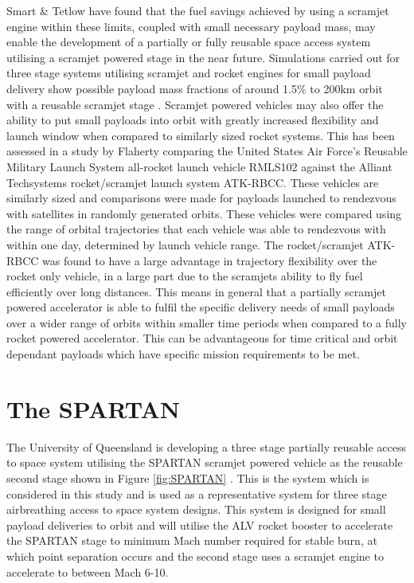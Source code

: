 Smart \& Tetlow \cite{Smart2009} have found that the fuel savings achieved by using a scramjet engine within these limits, coupled with small necessary payload mass, may enable the development of a partially or fully reusable space access system utilising a scramjet powered stage in the near future. Simulations carried out  for three stage systems utilising scramjet and rocket engines for small payload delivery show possible payload mass fractions of around 1.5\% to 200km orbit with a reusable scramjet stage  \cite{Smart2009}. Scramjet powered vehicles may also offer the ability to put small payloads into orbit with greatly increased flexibility and launch window when compared to similarly sized rocket systems. This has been assessed in a study by Flaherty  \cite{Flaherty2010} comparing the United States Air Force's Reusable Military Launch System all-rocket launch vehicle RMLS102 against the Alliant Techsystems rocket/scramjet launch system ATK-RBCC. These vehicles are similarly sized and comparisons were made for payloads launched to rendezvous with satellites in randomly generated orbits. These vehicles were compared using the range of orbital trajectories that each vehicle was able to rendezvous with within one day, determined by launch vehicle range. The rocket/scramjet ATK-RBCC was found to have a large advantage in trajectory flexibility over the rocket only vehicle, in a large part due to the scramjets ability to fly fuel efficiently over long distances. This means in general that a partially scramjet powered accelerator  is able to fulfil the specific delivery needs of small payloads over a wider range of orbits within smaller time periods when compared to a fully rocket powered accelerator. This can be advantageous for time critical and orbit dependant payloads which have specific mission requirements to be met. 




\section{The SPARTAN}


The University of Queensland is developing a three stage partially reusable access to space system utilising the SPARTAN scramjet powered vehicle as the reusable second stage shown in Figure \ref{fig:SPARTAN} \cite{Jazra2013}. This is the system which is considered in this study and is used as a representative system for three stage airbreathing access to space system designs. This system is designed for small payload deliveries to orbit and will utilise the ALV rocket booster to accelerate the SPARTAN stage to minimum Mach number required for stable burn, at which point separation occurs and the second stage uses a scramjet engine to accelerate to between Mach 6-10.

